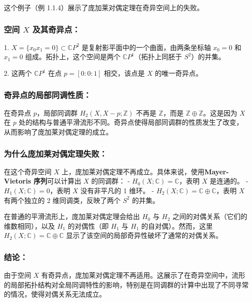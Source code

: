 \documentclass[lang=cn,zihao=5,twoside,fontset=none]{textbook}
\begin{document}
\begin{solution}
	这个例子（例 1.1.4）展示了庞加莱对偶定理在奇异空间上的失败。

\subsubsection{空间 $X$ 及其奇异点：}

1. $X = \{ x_0 x_1 = 0 \} \subset \mathbb{C}P^2$ 是复射影平面中的一个曲面，由两条坐标轴 $x_0 = 0$ 和 $x_1 = 0$ 组成。拓扑上，这个空间是两个 $\mathbb{C}P^1$（拓扑上同胚于 $S^2$）的并集。

2. 这两个 $\mathbb{C}P^1$ 在点 $p = [0 : 0 : 1]$ 相交，该点是 $X$ 的唯一奇异点。

\subsubsection{奇异点的局部同调性质：}

在奇异点 $p$，局部同调群 $H_2(X, X - p; \mathbb{Z})$ 不再是 $\mathbb{Z}$，而是 $\mathbb{Z} \oplus \mathbb{Z}$。这是因为 $X$ 在 $p$ 处的结构与普通平滑流形不同。奇异点使得局部同调群的性质发生了改变，从而影响了庞加莱对偶定理的成立。

\subsubsection{为什么庞加莱对偶定理失败：}

在这个奇异空间 $X$ 上，庞加莱对偶定理不再成立。具体来说，使用\textbf{Mayer-Vietoris 序列}可以计算出 $X$ 的同调群：
- $H_0(X; \mathbb{C}) = \mathbb{C}$，表明 $X$ 是连通的。
- $H_1(X; \mathbb{C}) = 0$，表明 $X$ 没有非平凡的 1 维环。
- $H_2(X; \mathbb{C}) = \mathbb{C} \oplus \mathbb{C}$，表明 $X$ 有两个独立的 2 维同调类，反映了两个 $S^2$ 的并集。

在普通的平滑流形上，庞加莱对偶定理会给出 $H_0$ 与 $H_2$ 之间的对偶关系（它们的维数相同），以及 $H_1$ 的对偶性（即 $H_1$ 与 $H_1$ 的自对偶）。然而，这里 $H_2(X; \mathbb{C}) = \mathbb{C} \oplus \mathbb{C}$ 显示了该空间的局部奇异性破坏了通常的对偶关系。

\subsubsection{结论：}

由于空间 $X$ 有奇异点，庞加莱对偶定理不再适用。这展示了在奇异空间中，流形的局部拓扑结构对全局同调特性的影响，特别是在同调群的计算中出现了不同寻常的情况，使得对偶关系无法成立。


\end{solution}
\end{document}
